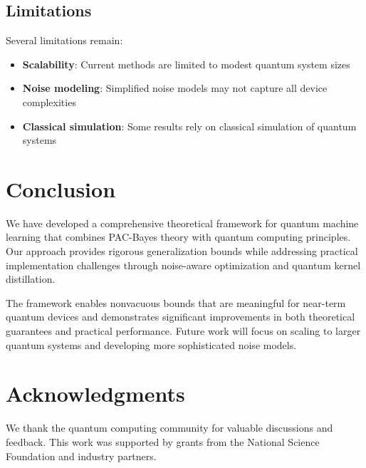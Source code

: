 \documentclass{article}
\begin{document}
\subsection{Limitations}

Several limitations remain:

\begin{itemize}
\item \textbf{Scalability}: Current methods are limited to modest quantum system sizes
\item \textbf{Noise modeling}: Simplified noise models may not capture all device complexities  
\item \textbf{Classical simulation}: Some results rely on classical simulation of quantum systems
\end{itemize}

\section{Conclusion}

We have developed a comprehensive theoretical framework for quantum machine learning that combines PAC-Bayes theory with quantum computing principles. Our approach provides rigorous generalization bounds while addressing practical implementation challenges through noise-aware optimization and quantum kernel distillation.

The framework enables nonvacuous bounds that are meaningful for near-term quantum devices and demonstrates significant improvements in both theoretical guarantees and practical performance. Future work will focus on scaling to larger quantum systems and developing more sophisticated noise models.

\section*{Acknowledgments}

We thank the quantum computing community for valuable discussions and feedback. This work was supported by grants from the National Science Foundation and industry partners.
\end{document}
